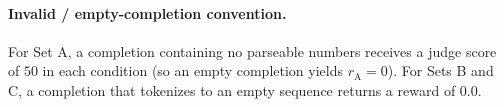 \paragraph{Invalid / empty-completion convention.} For Set A, a completion containing no parseable numbers receives a judge score of $50$ in each condition (so an empty completion yields $r_{\mathrm{A}} = 0$). For Sets B and C, a completion that tokenizes to an empty sequence returns a reward of $0.0$.
